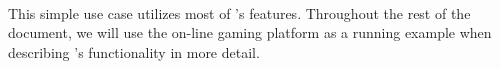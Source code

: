 \paragraph{}
This simple use case utilizes most of \ipc's features.
Throughout the rest of the document, we will use the on-line gaming platform as a running example when describing \ipc's functionality in more detail.
